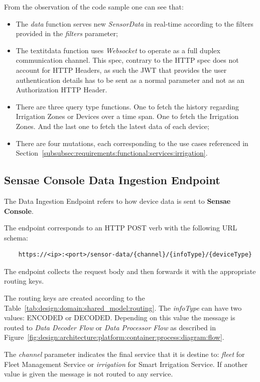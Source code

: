 From the observation of the code sample one can see that:

\begin{itemize}
    \item The \textit{data} function serves new \textit{SensorData} in real-time according to the filters provided in the \textit{filters} parameter;
    \item The textit{data} function uses \textit{Websocket} to operate as a full duplex communication channel. This spec, contrary to the HTTP spec does not account for HTTP Headers, as such the \gls{JWT} that provides the user authentication details has to be sent as a normal parameter and not as an Authorization HTTP Header.
    \item  There are three query type functions. One to fetch the history regarding Irrigation Zones or Devices over a time span. One to fetch the Irrigation Zones. And the last one to fetch the latest data of each device;
    \item There are four mutations, each corresponding to the use cases referenced in Section~\ref{subsubsec:requirements:functional:services:irrigation}.
\end{itemize}

\subsection{Sensae Console Data Ingestion Endpoint}
\label{subsec:implementation:description:ingestion}

The Data Ingestion Endpoint refers to how device data is sent to \textbf{Sensae Console}.

The endpoint corresponds to an HTTP POST verb with the following \gls{URL} schema:

\begin{verbatim}
    https://<ip>:<port>/sensor-data/{channel}/{infoType}/{deviceType}
\end{verbatim}

The endpoint collects the request body and then forwards it with the appropriate routing keys.

The routing keys are created according to the Table~\ref{tab:design:domain:shared_model:routing}. The \textit{infoType} can have two values: ENCODED or DECODED. Depending on this value the message is routed to \textit{Data Decoder Flow} or \textit{Data Processor Flow} as described in Figure~\ref{fig:design:architecture:platform:container:process:diagram:flow}.

The \textit{channel} parameter indicates the final service that it is destine to: \textit{fleet} for Fleet Management Service or \textit{irrigation} for Smart Irrigation Service. If another value is given the message is not routed to any service.

